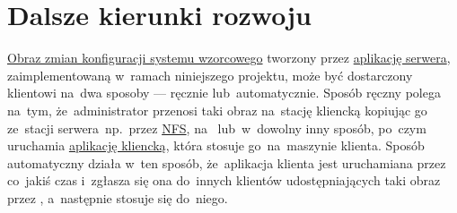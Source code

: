 \documentclass[thesis]{subfiles}
\begin{document}
%

\section{Dalsze kierunki rozwoju}

\hyperref[sec:obraz-zmian-konfiguracji]{Obraz zmian konfiguracji systemu wzorcowego} tworzony przez \hyperref[sec:srv-app]{aplikację serwera}, zaimplementowaną w~ramach niniejszego projektu, może być dostarczony klientowi na~dwa sposoby --- ręcznie lub~automatycznie. Sposób ręczny polega na~tym, że~administrator przenosi taki obraz na~stację kliencką kopiując go ze~stacji serwera~np.~przez \href{https://en.wikipedia.org/wiki/Network_File_System}{NFS}, na~ lub~w~dowolny inny sposób, po~czym uruchamia \hyperref[sec:cli-app]{aplikację kliencką}, która stosuje go~na~maszynie klienta. Sposób automatyczny działa w~ten sposób, że~aplikacja klienta jest uruchamiana przez  co~jakiś czas i~zgłasza się ona do~innych klientów udostępniających taki obraz przez \sftp{}, a~następnie stosuje się do~niego.
\end{document}
